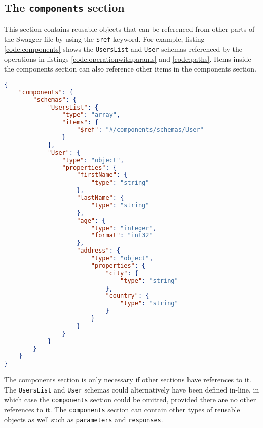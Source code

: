 \subsection{The \texttt{components} section}
This section contains reusable objects that can be referenced from other parts of the Swagger file by using the \texttt{\$ref} keyword. For example, listing \ref{code:components} shows the \texttt{UsersList} and \texttt{User} schemas referenced by the operations in listings \ref{code:operationwithparams} and \ref{code:paths}. Items inside the components section can also reference other items in the components section.\\
\begin{minipage}{\textwidth}
\begin{lstlisting}[caption={Components section with schemas},label={code:components},language=json]
{
    "components": {
        "schemas": {
            "UsersList": {
                "type": "array",
                "items": {
                    "$ref": "#/components/schemas/User"
                }
            },
            "User": {
                "type": "object",
                "properties": {
                    "firstName": {
                        "type": "string"
                    },
                    "lastName": {
                        "type": "string"
                    },
                    "age": {
                        "type": "integer",
                        "format": "int32"
                    },
                    "address": {
                        "type": "object",
                        "properties": {
                            "city": {
                                "type": "string"
                            },
                            "country": {
                                "type": "string"
                            }
                        }
                    }
                }
            }
        }
    }
}
\end{lstlisting}
\end{minipage}
The components section is only necessary if other sections have references to it. The \texttt{UsersList} and \texttt{User} schemas could alternatively have been defined in-line, in which case the \texttt{components} section could be omitted, provided there are no other references to it. The \texttt{components} section can contain other types of reusable objects as well such as \texttt{parameters} and \texttt{responses}\cite{components}.

